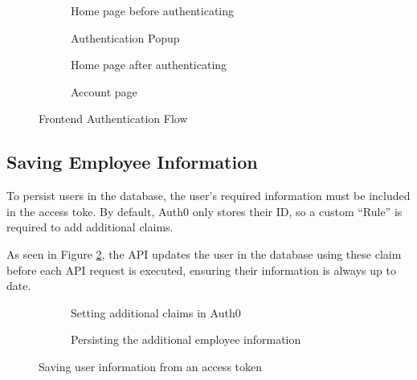 \begin{figure}[h]
  \centering

  \begin{subfigure}{\subfigwidth}
    \centering
    \caption{Home page before authenticating}
  \end{subfigure}
  \begin{subfigure}{\subfigwidth}
    \centering
    \caption{Authentication Popup}
  \end{subfigure}
  \begin{subfigure}{\subfigwidth}
    \centering
    \caption{Home page after authenticating}
  \end{subfigure}
  \begin{subfigure}{\subfigwidth}
    \centering
    \caption{Account page}
  \end{subfigure}

  \caption{Frontend Authentication Flow}
  \label{fig:authFlow}
\end{figure}

\subsection{Saving Employee Information}

To persist users in the database, the user's required
information must be included in the access toke.
By default, Auth0 only stores their ID, so a custom
\enquote{Rule} is required to add additional claims.

As seen in Figure \ref{fig:userInfo}, the API updates the
user in the database using these claim before each API
request is executed, ensuring their information is always
up to date.

\begin{figure}[h]
  \centering
  \small
  \begin{subfigure}{\linewidth}
    
    \caption{Setting additional claims in Auth0}
  \end{subfigure}
  \begin{subfigure}{\linewidth}
    
    \caption{Persisting the additional employee
      information}
  \end{subfigure}

  \caption{Saving user information from an access token}
  \label{fig:userInfo}
\end{figure}
